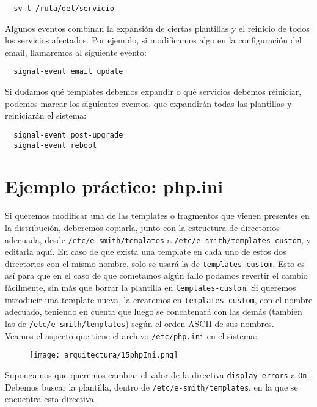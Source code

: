 \begin{lstlisting}
  sv t /ruta/del/servicio
\end{lstlisting}

Algunos eventos combinan la expansión de ciertas plantillas y el reinicio de todos los servicios afectados. Por ejemplo, si modificamos algo en la configuración del email, llamaremos al siguiente evento:

\begin{lstlisting}
  signal-event email update
\end{lstlisting}

Si dudamos qué templates debemos expandir o qué servicios debemos reiniciar, podemos marcar los siguientes eventos, que expandirán todas las plantillas y reiniciarán el sistema:

\begin{lstlisting}
  signal-event post-upgrade
  signal-event reboot
\end{lstlisting}

\section{Ejemplo práctico: php.ini}

Si queremos modificar una de las templates o fragmentos que vienen presentes en la distribución, deberemos copiarla, junto con la estructura de directorios adecuada, desde \lstinline!/etc/e-smith/templates! a \lstinline!/etc/e-smith/templates-custom!, y editarla aquí. En caso de que exista una template en cada uno de estos dos directorios con el mismo nombre, solo se usará la de \lstinline!templates-custom!. Esto es así para que en el caso de que cometamos algún fallo podamos revertir el cambio fácilmente, sin más que borrar la plantilla en \lstinline!templates-custom!. Si queremos introducir una template nueva, la crearemos en \lstinline!templates-custom!, con el nombre adecuado, teniendo en cuenta que luego se concatenará con las demás (también las de \lstinline!/etc/e-smith/templates!) según el orden ASCII de sus nombres.\\

Veamos el aspecto que tiene el archivo \lstinline!/etc/php.ini! en el sistema:

\begin{figure}[H]
    \centering
    \texttt{[image: arquitectura/15phpIni.png]}
\end{figure}

Supongamos que queremos cambiar el valor de la directiva \lstinline!display_errors! a \lstinline!On!. Debemos buscar la plantilla, dentro de \lstinline!/etc/e-smith/templates!, en la que se encuentra esta directiva.


